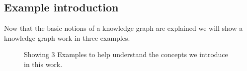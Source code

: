 \documentclass{article}
\begin{document}
\subsection{Example introduction}
Now that the basic notions of a knowledge graph are explained we will show a knowledge graph work in three examples. 
\begin{figure}[ht]
	\centering
	\caption{Showing 3 Examples to help understand the concepts we introduce in this work.}
	\label{fig:Antipattern}
\end{figure}
\end{document}
